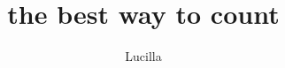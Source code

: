 \documentclass[a4paper, 11pt]{report}
\title{\Huge the best way to count}
\author{\Large Lucilla}
\date{}
\begin{document}
\vfill \maketitle \vfill \newpage











\end{document}
